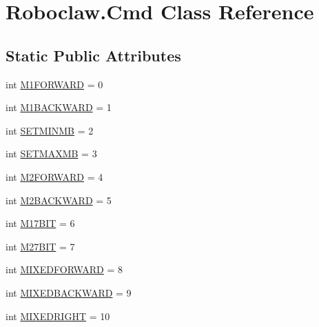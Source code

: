 \hypertarget{classtoxic__hardware_1_1roboclaw__3_1_1Roboclaw_1_1Cmd}{}\section{Roboclaw.\+Cmd Class Reference}
\label{classtoxic__hardware_1_1roboclaw__3_1_1Roboclaw_1_1Cmd}
\subsection*{Static Public Attributes}
\begin{DoxyCompactItemize}
\item 
int \mbox{\hyperlink{classtoxic__hardware_1_1roboclaw__3_1_1Roboclaw_1_1Cmd_a6fbd0a7399dbe49e1c4f10320a0bce05}{M1\+F\+O\+R\+W\+A\+RD}} = 0
\item 
int \mbox{\hyperlink{classtoxic__hardware_1_1roboclaw__3_1_1Roboclaw_1_1Cmd_aaddaee1e3f47d2dea0606ba42f9ae366}{M1\+B\+A\+C\+K\+W\+A\+RD}} = 1
\item 
int \mbox{\hyperlink{classtoxic__hardware_1_1roboclaw__3_1_1Roboclaw_1_1Cmd_aec7863ce95adb6df8cdd805f03308333}{S\+E\+T\+M\+I\+N\+MB}} = 2
\item 
int \mbox{\hyperlink{classtoxic__hardware_1_1roboclaw__3_1_1Roboclaw_1_1Cmd_ae9073696e45e2bd9fc89ea7ac55c9241}{S\+E\+T\+M\+A\+X\+MB}} = 3
\item 
int \mbox{\hyperlink{classtoxic__hardware_1_1roboclaw__3_1_1Roboclaw_1_1Cmd_a2b83b23d87ba642f2f3bc98a1c761851}{M2\+F\+O\+R\+W\+A\+RD}} = 4
\item 
int \mbox{\hyperlink{classtoxic__hardware_1_1roboclaw__3_1_1Roboclaw_1_1Cmd_a74857241586e205cacf8b88815b12e40}{M2\+B\+A\+C\+K\+W\+A\+RD}} = 5
\item 
int \mbox{\hyperlink{classtoxic__hardware_1_1roboclaw__3_1_1Roboclaw_1_1Cmd_a40c2006f4b2590d5afb118137d899e2b}{M17\+B\+IT}} = 6
\item 
int \mbox{\hyperlink{classtoxic__hardware_1_1roboclaw__3_1_1Roboclaw_1_1Cmd_ad760450d0f321d75a1194c5eb6af154c}{M27\+B\+IT}} = 7
\item 
int \mbox{\hyperlink{classtoxic__hardware_1_1roboclaw__3_1_1Roboclaw_1_1Cmd_a1fdd8dee03e0e259170950830ff13cf5}{M\+I\+X\+E\+D\+F\+O\+R\+W\+A\+RD}} = 8
\item 
int \mbox{\hyperlink{classtoxic__hardware_1_1roboclaw__3_1_1Roboclaw_1_1Cmd_a33530a0c1fd0ea54e33982788e9e5663}{M\+I\+X\+E\+D\+B\+A\+C\+K\+W\+A\+RD}} = 9
\item 
int \mbox{\hyperlink{classtoxic__hardware_1_1roboclaw__3_1_1Roboclaw_1_1Cmd_a398bed0c793dc5fb515257786803fa29}{M\+I\+X\+E\+D\+R\+I\+G\+HT}} = 10

\end{DoxyCompactItemize}
